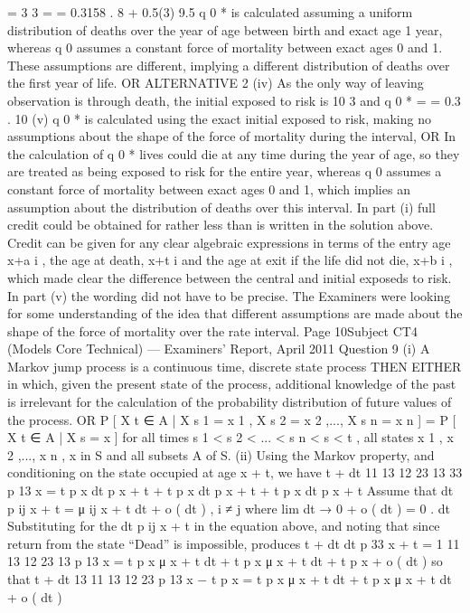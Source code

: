 \documentclass[a4paper,12pt]{article}
\begin{document}
\begin{enumerate}
=
3
3
=
= 0.3158 .
8 + 0.5(3) 9.5
q 0 * is calculated assuming a uniform distribution of deaths over the year of age
between birth and exact age 1 year, whereas q 0 assumes a constant force of mortality
between exact ages 0 and 1.
These assumptions are different, implying a different distribution of deaths over the
first year of life.
OR ALTERNATIVE 2
(iv) As the only way of leaving observation is through death, the initial exposed to risk is 10
3
and q 0 * =
= 0.3 .
10
(v) q 0 * is calculated using the exact initial exposed to risk, making no assumptions about
the shape of the force of mortality during the interval,
OR
In the calculation of q 0 * lives could die at any time during the year of age, so they are
treated as being exposed to risk for the entire year, whereas q 0 assumes a constant force
of mortality between exact ages 0 and 1, which implies an assumption about the
distribution of deaths over this interval.
In part (i) full credit could be obtained for rather less than is written in the solution above.
Credit can be given for any clear algebraic expressions in terms of the entry age x+a i , the
age at death, x+t i and the age at exit if the life did not die, x+b i , which made clear the
difference between the central and initial exposeds to risk.
In part (v) the wording did not have to be precise. The Examiners were looking for some
understanding of the idea that different assumptions are made about the shape of the force of
mortality over the rate interval.
Page 10Subject CT4 (Models Core Technical) — Examiners’ Report, April 2011
Question 9
(i)
A Markov jump process is a continuous time, discrete state process
THEN EITHER
in which, given the present state of the process, additional knowledge of the past is
irrelevant for the calculation of the probability distribution of future values of the
process.
OR
P [ X t ∈ A | X s 1 = x 1 , X s 2 = x 2 ,..., X s n = x n ] = P [ X t ∈ A | X s = x ]
for all times s 1 < s 2 < ... < s n < s < t , all states x 1 , x 2 ,..., x n , x in S and all subsets A of S.
(ii)
Using the Markov property, and conditioning on the state occupied
at age x + t, we have
t + dt
11
13
12
23
13
33
p 13
x = t p x dt p x + t + t p x dt p x + t + t p x dt p x + t
Assume that
dt
p ij x + t = μ ij x + t dt + o ( dt ) , i ≠ j
where lim
dt → 0
+
o ( dt )
= 0 .
dt
Substituting for the dt p ij x + t in the equation above, and noting that
since return from the state “Dead” is impossible, produces
t + dt
dt
p 33
x + t = 1
11 13
12 23
13
p 13
x = t p x μ x + t dt + t p x μ x + t dt + t p x + o ( dt )
so that
t + dt
13
11 13
12 23
p 13
x − t p x = t p x μ x + t dt + t p x μ x + t dt + o ( dt )

\end{enumerate}
\end{document}
